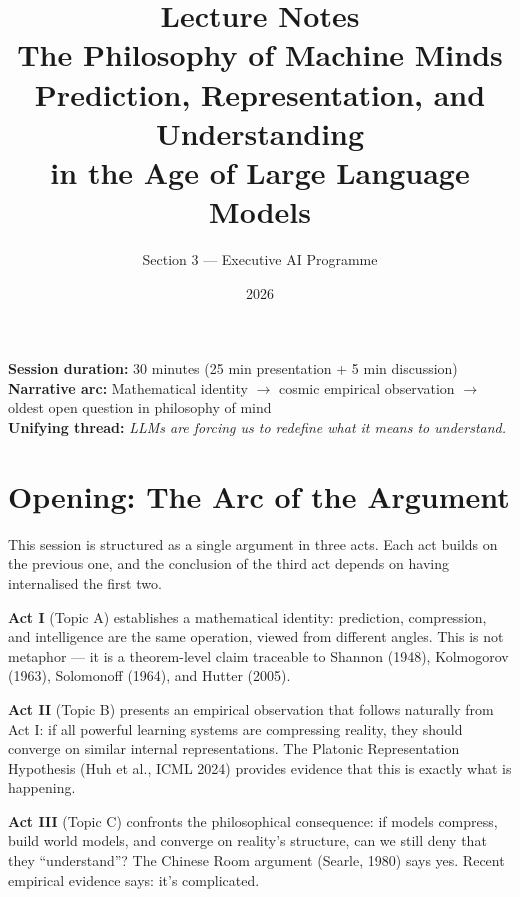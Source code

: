 \documentclass[11pt, a4paper]{article}
\title{\textbf{Lecture Notes}\\[0.3em]
  \LARGE The Philosophy of Machine Minds\\[0.2em]
  \large Prediction, Representation, and Understanding\\
  in the Age of Large Language Models}
\author{Section 3 --- Executive AI Programme}
\date{2026}
\begin{document}
\maketitle
\thispagestyle{empty}

\vspace{1em}
\begin{center}
\begin{tcolorbox}[colback=gray!5, colframe=black, width=0.85\textwidth]
\textbf{Session duration:} 30 minutes (25 min presentation + 5 min discussion)\\
\textbf{Narrative arc:} Mathematical identity $\to$ cosmic empirical observation $\to$ oldest open question in philosophy of mind\\
\textbf{Unifying thread:} \emph{LLMs are forcing us to redefine what it means to understand.}
\end{tcolorbox}
\end{center}

\tableofcontents
\newpage

\section{Opening: The Arc of the Argument}

This session is structured as a single argument in three acts. Each act
builds on the previous one, and the conclusion of the third act depends on
having internalised the first two.

\textbf{Act I} (Topic A) establishes a mathematical identity: prediction,
compression, and intelligence are the same operation, viewed from different
angles. This is not metaphor --- it is a theorem-level claim traceable to
Shannon (1948), Kolmogorov (1963), Solomonoff (1964), and Hutter (2005).

\textbf{Act II} (Topic B) presents an empirical observation that follows
naturally from Act I: if all powerful learning systems are compressing
reality, they should converge on similar internal representations. The
Platonic Representation Hypothesis (Huh et al., ICML 2024) provides
evidence that this is exactly what is happening.

\textbf{Act III} (Topic C) confronts the philosophical consequence: if
models compress, build world models, and converge on reality's structure,
can we still deny that they ``understand''? The Chinese Room argument
(Searle, 1980) says yes. Recent empirical evidence says: it's complicated.
\end{document}
